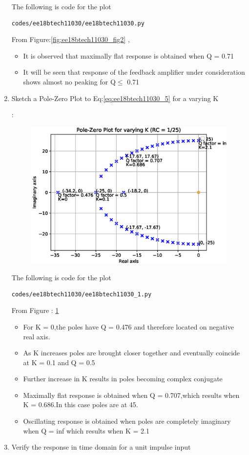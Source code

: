 \begin{enumerate}[label=\arabic*.,ref=\theenumi]
The following is code for the plot
\begin{lstlisting}
codes/ee18btech11030/ee18btech11030.py
\end{lstlisting}
From Figure:\ref{fig:ee18btech11030_fig2} ,
\begin{itemize}
\item It is observed that maximally flat response is obtained when Q = 0.71
\item It will be seen that response of the feedback amplifier under consideration shows almost no peaking for Q$\leq$ 0.71 
\end{itemize}
\item Sketch a Pole-Zero Plot to Eq:\ref{eq:ee18btech11030_5} for a varying K

\solution :
\begin{figure}[!ht]
\centering
  \includegraphics[width=\columnwidth]{./figs/ee18btech11030/ee18btech11030_fc1.eps}
\caption{}
\label{fig:ee18btech11030_fig3} 
\end{figure}

The following is code for the  plot
\begin{lstlisting}
codes/ee18btech11030/ee18btech11030_1.py
\end{lstlisting}
From Figure : \ref{fig:ee18btech11030_fig3} 
\begin{itemize}
\item For K = 0,the poles have Q = 0.476 and therefore located on negative real axis. 
\item As K increases poles are brought closer together and eventually coincide at K = 0.1 and Q = 0.5
\item Further increase in K results in poles becoming complex conjugate 
\item Maximally flat response is obtained when Q = 0.707,which results when K = 0.686.In this case poles are at 45\degree .
\item Oscillating response is obtained when poles are completely imaginary when Q = inf which results when K = 2.1 
\end{itemize}
\item Verify the response in time domain for a unit impulse input 


\end{enumerate}
